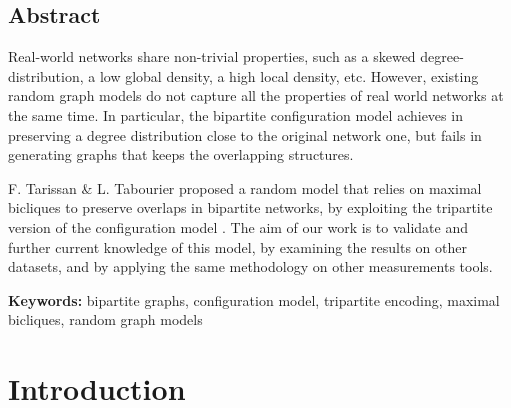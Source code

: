 \documentclass[table]{report}
\begin{document}

 
\dominitoc%
\tableofcontents


\newpage
\section*{Abstract}
Real-world networks share non-trivial properties, such as a skewed degree-distribution, a low global density, a high local density, etc. However, existing random graph models do not capture all the properties of real world networks at the same time. In particular, the bipartite configuration model achieves in preserving a degree distribution close to the original network one, but fails in generating graphs that keeps the overlapping structures.


\medbreak
F. Tarissan \& L. Tabourier proposed a random model that relies on maximal bicliques to preserve overlaps in bipartite networks, by exploiting the tripartite version of the configuration model \cite{fabien_lionel}. The aim of our work is to validate and further current knowledge of this model, by examining the results on other datasets, and by applying the same methodology on other measurements tools. 




%
%

\medbreak
\medbreak
\noindent
\textbf{Keywords:} bipartite graphs, configuration model, tripartite encoding, maximal bicliques, random graph models
\medbreak



\chapter{Introduction}
\end{document}
